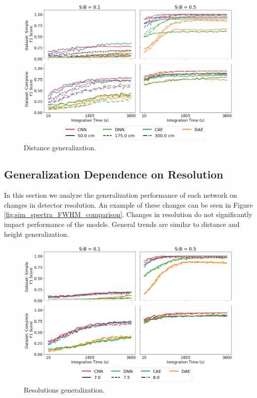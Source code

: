 \begin{figure}[H]
	\centering
	\includegraphics[width=1.0\linewidth]{images/sim-generalization-dist}
	\caption{Distance generalization.}
	\label{fig:sim-generalization-dist}
\end{figure}



\subsection{Generalization Dependence on Resolution}

In this section we analyze the generalization performance of each network on changes in detector resolution. An example of these changes can be seen in Figure \ref{fig:sim_spectra_FWHM_comparison}. Changes in resolution do not significantly impact performance of the models. General trends are similar to distance and height generalization.

\begin{figure}[H]
	\centering
	\includegraphics[width=1.0\linewidth]{images/sim-generalization-fwhm}
	\caption{Resolutions generalization.}
	\label{fig:sim-generalization-fwhm}
\end{figure}


